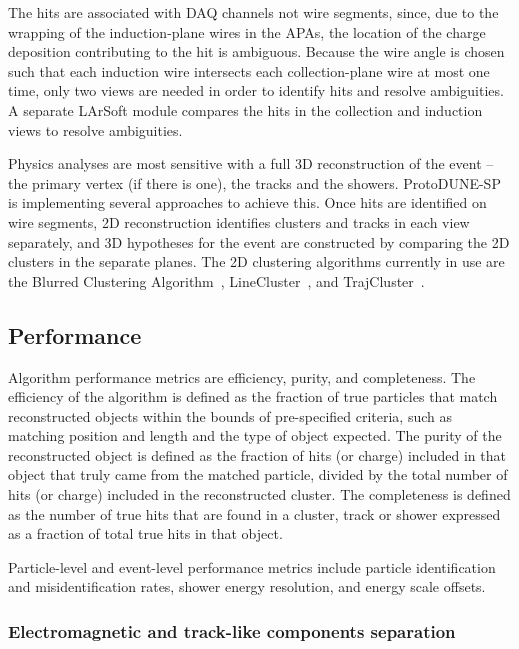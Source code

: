 The hits are associated with DAQ channels 
not wire segments, since, due to the wrapping of the induction-plane
wires in the APAs, the location of the %
charge deposition contributing to the hit is ambiguous. %
Because the wire angle
is chosen such that each induction wire intersects each collection-plane
wire at most one time, only two views are needed in order to identify
hits and resolve ambiguities.  A separate LArSoft module compares the
hits in the collection and induction views to
resolve ambiguities.  

Physics analyses are most sensitive with a full 3D reconstruction of the
event -- the primary vertex (if there is one), the tracks and the showers.
ProtoDUNE-SP is implementing several approaches to achieve this. Once hits are identified on wire
segments, 2D reconstruction identifies clusters and tracks
in each view separately, and 3D hypotheses for
the event are constructed by comparing the 2D clusters
in the separate planes.  The 2D clustering algorithms currently in
use are the Blurred Clustering Algorithm~\cite{blurredcluster},
LineCluster~\cite{linecluster}, and TrajCluster~\cite{trajcluster}.  

\subsection{Performance}

Algorithm performance metrics are efficiency, purity, and completeness.  The
efficiency of the algorithm is defined as the fraction of true particles that
match reconstructed objects within the bounds of pre-specified
criteria, such as matching position and length and the type of object
expected.  The purity of the reconstructed object is defined as the fraction of
hits (or charge) included in that object that truly came from the
matched particle, divided by the total number of hits (or charge)
included in the reconstructed cluster.  The completeness is defined as
the number of true hits that are found in a cluster, track or shower
expressed as a fraction of total true hits in that object.  

Particle-level and event-level performance metrics include particle identification
and misidentification rates, shower energy resolution, and energy scale offsets.


\subsubsection{Electromagnetic and track-like components separation}

